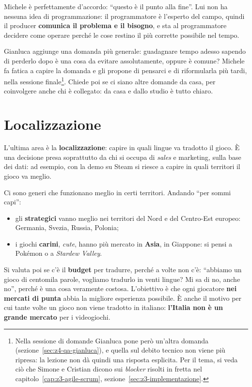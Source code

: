 Michele è perfettamente d'accordo: ``questo è il punto alla fine''. Lui non ha
nessuna idea di programmazione: il programmatore è l'esperto del campo, quindi
il producer \textbf{comunica il problema e il bisogno}, e sta al programmatore
decidere come operare perché le cose restino il più corrette possibile nel
tempo.

Gianluca aggiunge una domanda più generale: guadagnare tempo adesso sapendo di
perderlo dopo è una cosa da evitare assolutamente, oppure è comune? Michele fa
fatica a capire la domanda e gli propone di pensarci e di riformularla più
tardi, nella sessione finale\footnote{Nella sessione di domande Gianluca pone
però un'altra domanda (sezione~\ref{sec:z4-qa-gianluca}), e quella sul debito
tecnico non viene più ripresa: la lezione non dà quindi una risposta esplicita.
Per il tema, si veda ciò che Simone e Cristian dicono sui \emph{blocker}
risolti in fretta nel capitolo~\ref{cap:z3-agile-scrum},
sezione~\ref{sec:z3-implementazione}.}. Chiede poi se ci siano altre domande da
casa, per coinvolgere anche chi è collegato: da casa e dallo studio è tutto
chiaro.

\section{Localizzazione}
\label{sec:z4-localizzazione}

L'ultima area è la \textbf{localizzazione}: capire in quali lingue va tradotto il
gioco. È una decisione presa soprattutto da chi si occupa di \emph{sales} e
marketing, sulla base dei dati: ad esempio, con la demo su Steam si riesce a
capire in quali territori il gioco va meglio.

Ci sono generi che funzionano meglio in certi territori. Andando ``per sommi
capi'':
\begin{itemize}
  \item gli \textbf{strategici} vanno meglio nei territori del Nord e del Centro-Est
        europeo: Germania, Svezia, Russia, Polonia;
  \item i giochi \textbf{carini}, \emph{cute}, hanno più mercato in
        \textbf{Asia}, in Giappone: si pensi a Pokémon o a \emph{Stardew
        Valley}.
\end{itemize}

Si valuta poi se c'è il \textbf{budget} per tradurre, perché a volte non c'è:
``abbiamo un gioco di centomila parole, vogliamo tradurlo in venti lingue? Mi
sa di no, anche no'', perché è una cosa veramente costosa. L'obiettivo è che
ogni giocatore \textbf{nei mercati di punta} abbia la migliore esperienza
possibile. È anche il motivo per cui tante volte un gioco non viene tradotto in
italiano: \textbf{l'Italia non è un grande mercato} per i videogiochi.

